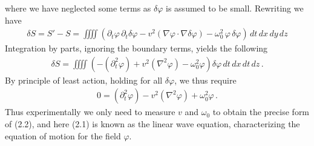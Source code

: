 \documentclass[11pt, onesided]{book}
\theoremstyle{break}
\theoremstyle{break}
\newcommand{\pd}{\partial}
\begin{document}
where we have neglected some terms as $\delta\varphi$ is assumed to be small. Rewriting we have
\begin{align*}
\delta S = S' - S = \iiiint (\pd_t \varphi\, \pd_t \delta \varphi - v^2 (\nabla\varphi \cdot \nabla\delta \varphi) - \omega_0^2 \,\varphi\, \delta \varphi) \,dt\,dx\,dy\,dz
\end{align*}
Integration by parts, ignoring the boundary terms, yields the following
\begin{align*}
\delta S =  \iiiint \left(-(\pd_t^2 \varphi) + v^2 (\nabla^2 \varphi) - \omega_0^2 \varphi \right)\delta\varphi  \,dt\,dx\,dt\,dz\,.
\end{align*}
By principle of least action, holding for all $\delta \varphi$, we thus require 
\begin{align}
0 = (\pd_t^2 \varphi) - v^2 (\nabla^2 \varphi) + \omega_0^2 \varphi \,.
\end{align}
Thus experimentally we only need to measure $v$ and $\omega_0$ to obtain the precise form of (2.2), and here (2.1) is known as the linear wave equation, characterizing the equation of motion for the field $\varphi$. \\
\end{document}
